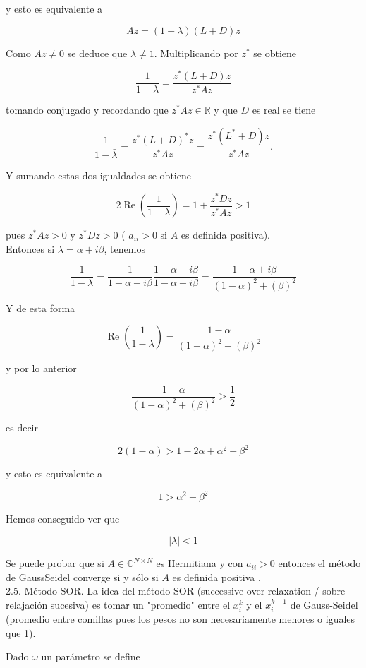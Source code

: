 \documentclass[10pt]{book}
\begin{document}
y esto es equivalente a

$$
A z=(1-\lambda)(L+D) z
$$

Como $A z \neq 0$ se deduce que $\lambda \neq 1$. Multiplicando por $z^{*}$ se obtiene

$$
\frac{1}{1-\lambda}=\frac{z^{*}(L+D) z}{z^{*} A z}
$$

tomando conjugado y recordando que $z^{*} A z \in \mathbb{R}$ y que $D$ es real se tiene

$$
\frac{1}{1-\bar{\lambda}}=\frac{z^{*}(L+D)^{*} z}{z^{*} A z}=\frac{z^{*}\left(L^{*}+D\right) z}{z^{*} A z} .
$$

Y sumando estas dos igualdades se obtiene

$$
2 \operatorname{Re}\left(\frac{1}{1-\lambda}\right)=1+\frac{z^{*} D z}{z^{*} A z}>1
$$

pues $z^{*} A z>0$ y $z^{*} D z>0$ ( $a_{i i}>0$ si $A$ es definida positiva).\\
Entonces si $\lambda=\alpha+i \beta$, tenemos

$$
\frac{1}{1-\lambda}=\frac{1}{1-\alpha-i \beta} \frac{1-\alpha+i \beta}{1-\alpha+i \beta}=\frac{1-\alpha+i \beta}{(1-\alpha)^{2}+(\beta)^{2}}
$$

Y de esta forma

$$
\operatorname{Re}\left(\frac{1}{1-\lambda}\right)=\frac{1-\alpha}{(1-\alpha)^{2}+(\beta)^{2}}
$$

y por lo anterior

$$
\frac{1-\alpha}{(1-\alpha)^{2}+(\beta)^{2}}>\frac{1}{2}
$$

es decir

$$
2(1-\alpha)>1-2 \alpha+\alpha^{2}+\beta^{2}
$$

y esto es equivalente a

$$
1>\alpha^{2}+\beta^{2}
$$

Hemos conseguido ver que

$$
|\lambda|<1
$$

Se puede probar que si $A \in \mathbb{C}^{N \times N}$ es Hermitiana y con $a_{i i}>0$ entonces el método de GaussSeidel converge si y sólo si $A$ es definida positiva .\\
2.5. Método SOR. La idea del método SOR (successive over relaxation / sobre relajación sucesiva) es tomar un "promedio" entre el $x_{i}^{k}$ y el $x_{i}^{k+1}$ de Gauss-Seidel (promedio entre comillas pues los pesos no son necesariamente menores o iguales que 1).

Dado $\omega$ un parámetro se define
\end{document}
